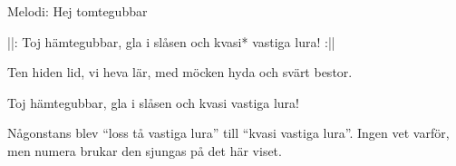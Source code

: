 \begin{song}


\begin{songmeta}
Melodi: Hej tomtegubbar
\end{songmeta}

\begin{songtext}
||: Toj hämtegubbar, gla i slåsen
och kvasi* vastiga lura! :||

Ten hiden lid, vi heva lär,
med möcken hyda och svärt bestor.

Toj hämtegubbar, gla i slåsen
och kvasi vastiga lura!
\end{songtext}

\begin{songnotes}
Någonstans blev \textquotedblleft{}loss tå vastiga lura\textquotedblright{} till \textquotedblleft{}kvasi vastiga lura\textquotedblright{}. Ingen vet varför, men numera brukar den sjungas på det här viset.
\end{songnotes}

\end{song}
